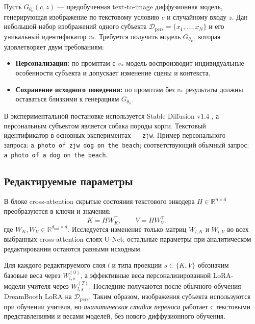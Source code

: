 \documentclass{article}
\newcommand{\Wbase}{W^{(0)}}
\newcommand{\Wteach}{W^{(T)}}
\begin{document}
Пусть $G_{\theta_0}(c,z)$ --- предобученная text-to-image диффузионная модель,
генерирующая изображение по текстовому условию $c$ и случайному входу $z$.
Дан небольшой набор изображений одного субъекта
$\mathcal{D}_{\mathrm{pers}}=\{x_1,\ldots,x_N\}$ и его
уникальный идентификатор $v_*$.
Требуется получить модель $G_{\theta_E}$, которая удовлетворяет двум требованиям:
\begin{itemize}
    \item \textbf{Персонализация:} по промптам с $v_*$ модель воспроизводит
    индивидуальные особенности субъекта и допускает изменение сцены и контекста.
    \item \textbf{Сохранение исходного поведения:} по промптам без $v_*$
    результаты должны оставаться близкими к генерациям $G_{\theta_0}$.
\end{itemize}

В экспериментальной постановке используется Stable Diffusion v1.4
\citep{rombach2022ldm}, а персональным субъектом является собака породы корги.
Текстовый идентификатор в основных экспериментах --- \texttt{zjw}.
Пример персонального запроса: \texttt{a photo of zjw dog on the beach};
соответствующий обычный запрос: \texttt{a photo of a dog on the beach}.

\subsection{Редактируемые параметры}

В блоке cross-attention скрытые состояния текстового энкодера
$H\in\mathbb{R}^{n\times d}$ преобразуются в ключи и значения:
\begin{equation}\label{eq:kv}
    K=H W_K^{\top},\qquad V=H W_V^{\top},
\end{equation}
где $W_K,W_V\in\mathbb{R}^{d_{\mathrm{out}}\times d}$.
Исследуется изменение только матриц $W_{l,K}$ и $W_{l,V}$
во всех выбранных cross-attention слоях U-Net; остальные параметры
при аналитическом редактировании остаются равными исходным.

Для каждого редактируемого слоя $l$ и типа проекции $s\in\{K,V\}$
обозначим базовые веса через $\Wbase_{l,s}$, а эффективные веса
персонализированной LoRA-модели-учителя через $\Wteach_{l,s}$.
Последние получаются после обычного обучения DreamBooth LoRA на
$\mathcal{D}_{\mathrm{pers}}$. Таким образом, изображения субъекта
используются при обучении учителя, но \emph{аналитическая стадия переноса}
работает с текстовыми представлениями и весами моделей, без нового
диффузионного обучения.
\end{document}
